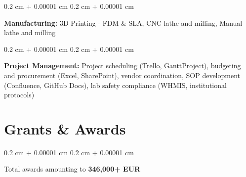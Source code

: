 \documentclass[10pt, letterpaper]{article}
\newenvironment{onecolentry}{
    \begin{adjustwidth}{
        0.2 cm + 0.00001 cm
    }{
        0.2 cm + 0.00001 cm
    }
}{
    \end{adjustwidth}
} %
\begin{document}
        \vspace{0.2 cm}
        \begin{onecolentry}
            \textbf{Manufacturing:} 3D Printing - FDM \& SLA, CNC lathe and milling, Manual lathe and milling
        \end{onecolentry}

        \vspace{0.2 cm}
        
        \begin{onecolentry}
        \textbf{Project Management:} Project scheduling (Trello, GanttProject), budgeting and procurement (Excel, SharePoint), vendor coordination, SOP development (Confluence, GitHub Docs), lab safety compliance (WHMIS, institutional protocols)
        \end{onecolentry}
















    \section{Grants \& Awards}
        \begin{onecolentry}
            Total awards amounting to \textbf{346,000+ EUR} 
            
        \end{onecolentry}
       \vspace{0.20 cm}
\end{document}
